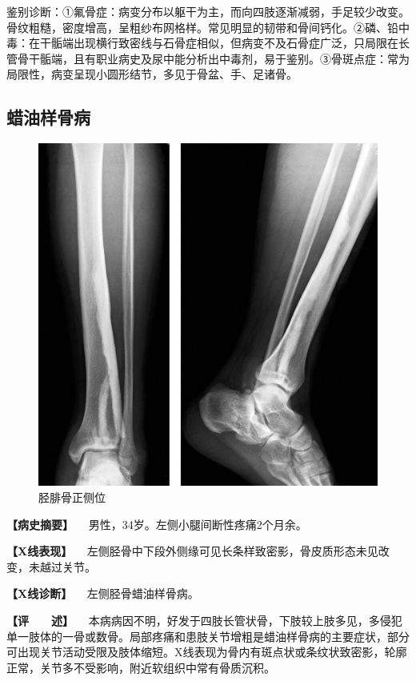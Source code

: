 鉴别诊断：①氟骨症：病变分布以躯干为主，而向四肢逐渐减弱，手足较少改变。骨纹粗糙，密度增高，呈粗纱布网格样。常见明显的韧带和骨间钙化。②磷、铅中毒：在干骺端出现横行致密线与石骨症相似，但病变不及石骨症广泛，只局限在长管骨干骺端，且有职业病史及尿中能分析出中毒剂，易于鉴别。③骨斑点症：常为局限性，病变呈现小圆形结节，多见于骨盆、手、足诸骨。

\subsection{蜡油样骨病}

\begin{figure}[!htbp]
 \centering
 \includegraphics{./images/Image00124.jpg}
 \captionsetup{justification=centering}
 \caption{胫腓骨正侧位}
 \label{fig2-8-10}
  \end{figure} 

\textbf{【病史摘要】} 　男性，34岁。左侧小腿间断性疼痛2个月余。

\textbf{【X线表现】}
　左侧胫骨中下段外侧缘可见长条样致密影，骨皮质形态未见改变，未越过关节。

\textbf{【X线诊断】} 　左侧胫骨蜡油样骨病。

\textbf{【评　　述】}
　本病病因不明，好发于四肢长管状骨，下肢较上肢多见，多侵犯单一肢体的一骨或数骨。局部疼痛和患肢关节增粗是蜡油样骨病的主要症状，部分可出现关节活动受限及肢体缩短。X线表现为骨内有斑点状或条纹状致密影，轮廓正常，关节多不受影响，附近软组织中常有骨质沉积。

